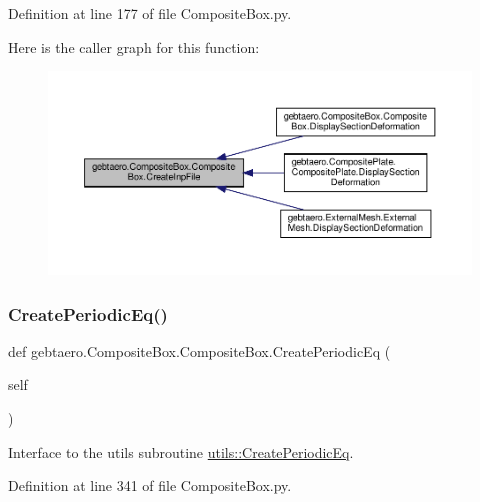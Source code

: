 Definition at line 177 of file Composite\+Box.\+py.

Here is the caller graph for this function\+:\nopagebreak
\begin{figure}[H]
\begin{center}
\leavevmode
\includegraphics[width=350pt]{classgebtaero_1_1_composite_box_1_1_composite_box_a005e7c9de0e4307ad9ff7ed4e8f7c8a4_icgraph}
\end{center}
\end{figure}
\mbox{\label{classgebtaero_1_1_composite_box_1_1_composite_box_a9328777b54ead0767f0075fe599b09d9}} 
\subsubsection{\texorpdfstring{Create\+Periodic\+Eq()}{CreatePeriodicEq()}}
{\footnotesize\ttfamily def gebtaero.\+Composite\+Box.\+Composite\+Box.\+Create\+Periodic\+Eq (\begin{DoxyParamCaption}\item[{}]{self }\end{DoxyParamCaption})}



Interface to the utils subroutine \hyperlink{namespacegebtaero_1_1utils_a4f786ecbe66af9f64c802adf4e0a990f}{utils\+::\+Create\+Periodic\+Eq}. 



Definition at line 341 of file Composite\+Box.\+py.

